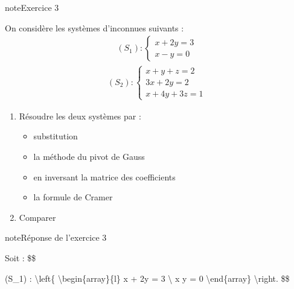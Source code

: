 \documentclass[letterpaper,10pt,french]{jupyterBook}
\begin{document}
\begin{sphinxadmonition}{note}{Exercice 3}

\sphinxAtStartPar
On considère les systèmes d’inconnues suivants :
\begin{equation*}
\begin{split}(S_1) :
\left\{
\begin{array}{l}
x + 2y = 3 \\
x - y  = 0
\end{array}
\right.
\end{split}
\end{equation*}\begin{equation*}
\begin{split}
(S_2) :
\left\{
\begin{array}{l}
x + y + z =2 \\
3x + 2y =2 \\
x + 4y + 3z=1
\end{array}
\right.
\end{split}
\end{equation*}\begin{enumerate}
%
\item {} 
\sphinxAtStartPar
Résoudre les deux systèmes par :
\begin{itemize}
\item {} 
\sphinxAtStartPar
substitution

\item {} 
\sphinxAtStartPar
la méthode du pivot de Gauss

\item {} 
\sphinxAtStartPar
en inversant la matrice des coefficients

\item {} 
\sphinxAtStartPar
la formule de Cramer

\end{itemize}

\item {} 
\sphinxAtStartPar
Comparer

\end{enumerate}
\end{sphinxadmonition}

\begin{sphinxadmonition}{note}{Réponse de l’exercice 3}

\sphinxAtStartPar
Soit :
\$\$

\sphinxAtStartPar
(S\_1) :
\textbackslash{}left\{
\textbackslash{}begin\{array\}\{l\}
x + 2y = 3 \textbackslash{}
x \sphinxhyphen{} y  = 0
\textbackslash{}end\{array\}
\textbackslash{}right.
\$\$
\end{sphinxadmonition}
\end{document}
